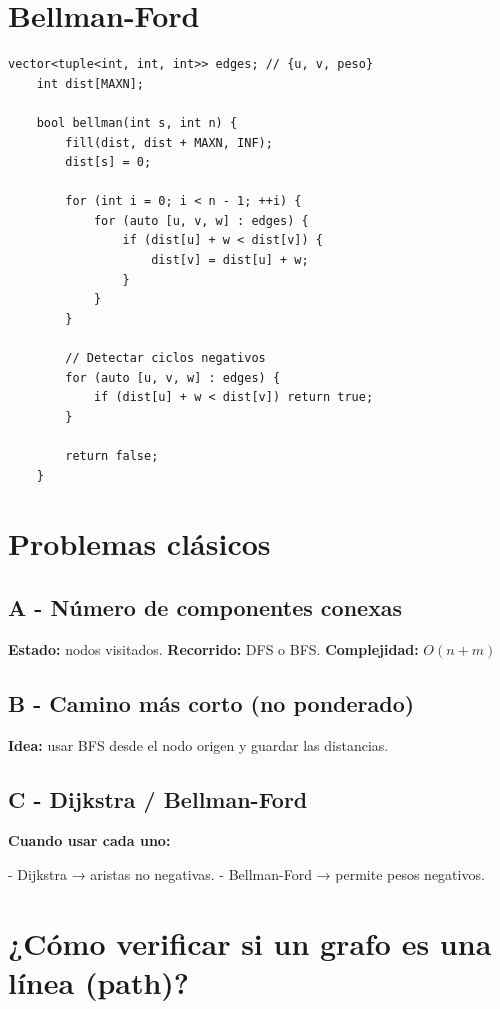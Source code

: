 \section{Bellman-Ford}

\begin{lstlisting}[caption=Bellman-Ford para grafos con pesos negativos]
	vector<tuple<int, int, int>> edges; // {u, v, peso}
	int dist[MAXN];
	
	bool bellman(int s, int n) {
		fill(dist, dist + MAXN, INF);
		dist[s] = 0;
		
		for (int i = 0; i < n - 1; ++i) {
			for (auto [u, v, w] : edges) {
				if (dist[u] + w < dist[v]) {
					dist[v] = dist[u] + w;
				}
			}
		}
		
		// Detectar ciclos negativos
		for (auto [u, v, w] : edges) {
			if (dist[u] + w < dist[v]) return true;
		}
		
		return false;
	}
\end{lstlisting}

\section{Problemas clásicos}

\subsection*{A - Número de componentes conexas}

\textbf{Estado:} nodos visitados.  
\textbf{Recorrido:} DFS o BFS.  
\textbf{Complejidad:} \( O(n + m) \)

\subsection*{B - Camino más corto (no ponderado)}

\textbf{Idea:} usar BFS desde el nodo origen y guardar las distancias.

\subsection*{C - Dijkstra / Bellman-Ford}

\textbf{Cuando usar cada uno:}

- Dijkstra → aristas no negativas.
- Bellman-Ford → permite pesos negativos.

\section{¿Cómo verificar si un grafo es una línea (path)?}



